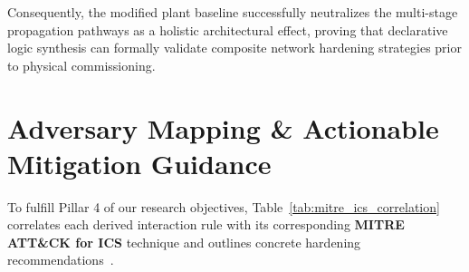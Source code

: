 \documentclass[target=mst,aauheader=aics,style=]{thud}
\begin{document}
Consequently, the modified plant baseline successfully neutralizes the multi-stage propagation pathways as a holistic architectural effect, proving that declarative logic synthesis can formally validate composite network hardening strategies prior to physical commissioning.
\section{Adversary Mapping \& Actionable Mitigation Guidance}
\label{sec:mitre_mapping}

To fulfill Pillar 4 of our research objectives, Table~\ref{tab:mitre_ics_correlation} correlates each derived interaction rule with its corresponding \textbf{MITRE ATT\&CK for ICS} technique and outlines concrete hardening recommendations~\cite{mitre_ics}.
\end{document}
